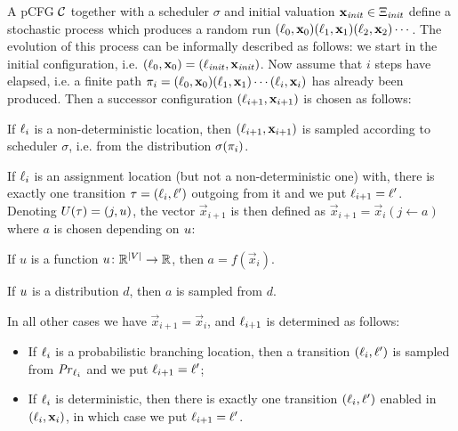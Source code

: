 \smallskip{}
A pCFG $\mathcal{C}$ together with a scheduler $\sigma$ and initial valuation 
$\mathbf{x}_{\mathit{init}}\in\Xi_{\mathit{init}}$ define a stochastic 
process which produces a random run 
$(\ell_0,\mathbf{x}_0)(\ell_1,\mathbf{x}_1)(\ell_2,\mathbf{x}_2)\cdots$. The evolution 
of 
this process can be informally described as follows: we start in the initial 
configuration, i.e. $(\ell_{0},\mathbf{x}_0)=(\ell_{\mathit{init}},\mathbf{x}_{\mathit{init}})$. 
Now assume that $i$ 
steps have elapsed, i.e. a finite path 
$\pi_i=(\ell_0,\mathbf{x}_0)(\ell_1,\mathbf{x}_1)\cdots(\ell_i,\mathbf{x}_i)$ has 
already 
been produced. Then a successor configuration $(\ell_{i+1},\mathbf{x}_{i+1})$ is 
chosen as follows:
\begin{compactitem}
\item
If $\ell_i$ is a non-deterministic location, then 
$(\ell_{i+1},\mathbf{x}_{i+1})$ is sampled according to scheduler $\sigma$, i.e. 
from 
the distribution $\sigma(\pi_i)$.
\item
If $\ell_i$ is an assignment location (but not a non-deterministic one) with, 
there 
is exactly one transition $\tau=(\ell_i,\ell')$ outgoing from it and we put 
$\ell_{i+1}=\ell'$. Denoting $U(\tau)=(j,u)$, the vector 
$\vec{x}_{i+1}$ is 
then defined as 
$\vec{x}_{i+1}=\vec{x}_{i}(j\leftarrow a)$ where $a$ is chosen depending on 
$u$:
\begin{compactitem}
\item If $u$ is a function $u\colon
\mathbb{R}^{|V|}\rightarrow \mathbb{R}$, then $a=f(\vec{x}_{i})$.
\item If $u$ is a distribution $d$, then $a$ 
is sampled from $d$.
\end{compactitem}
\item In all other cases we have $\vec{x}_{i+1}=\vec{x}_i$, and $\ell_{i+1}$ is 
determined as follows:
\begin{itemize}
	\item If $\ell_i$ is a probabilistic branching location, then a transition 
	$(\ell_i,\ell')$ is sampled from $\mathit{Pr}_{\ell_i}$ and we put
	$\ell_{i+1}=\ell'$;
	\item If $\ell_i$ is deterministic, then there is exactly one transition 
	$(\ell_i,\ell')$ enabled in $(\ell_i,\mathbf{x}_i)$, in which case we put 
	$\ell_{i+1}=\ell'$.
\end{itemize}
\end{compactitem}


